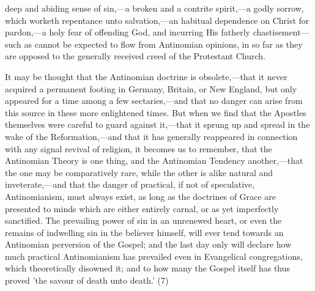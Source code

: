 \documentclass[
]{book}
\begin{document}
deep and abiding sense of sin,---a broken and a contrite spirit,---a godly sorrow, which worketh repentance unto salvation,---an habitual dependence on Christ for pardon,---a holy fear of offending God, and incurring His fatherly chastisement---such as cannot be expected to flow from Antinomian opinions, in so far as they are opposed to the generally received creed of the Protestant Church.

It may be thought that the Antinomian doctrine is obsolete,---that it never acquired a permanent footing in Germany, Britain, or New England, but only appeared for a time among a few sectaries,---and that no danger can arise from this source in these more enlightened times. But when we find that the Apostles themselves were careful to guard against it,---that it sprung up and spread in the wake of the Reformation,---and that it has generally reappeared in connection with any signal revival of religion, it becomes us to remember, that the Antinomian Theory is one thing, and the Antinomian Tendency another,---that the one may be comparatively rare, while the other is alike natural and inveterate,---and that the danger of practical, if not of speculative, Antinomianism, must always exist, as long as the doctrines of Grace are presented to minds which are either entirely carnal, or as yet imperfectly sanctified. The prevailing power of sin in an unrenewed heart, or even the remains of indwelling sin in the believer himself, will ever tend towards an Antinomian perversion of the Gospel; and the last day only will declare how much practical Antinomianism has prevailed even in Evangelical congregations, which theoretically disowned it; and to how many the Gospel itself has thus proved 'the savour of death unto death.' (7)
\end{document}
